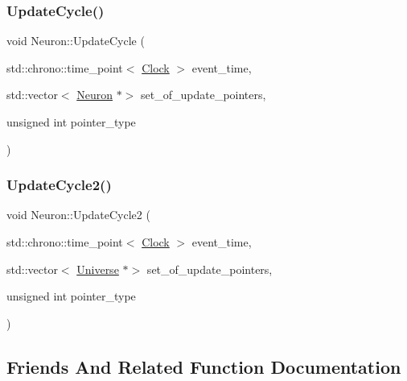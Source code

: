 \mbox{\label{classNeuron_a06f45a5d1de890da84d3644fe58ea0a9}} 
\subsubsection{\texorpdfstring{Update\+Cycle()}{UpdateCycle()}}
{\footnotesize\ttfamily void Neuron\+::\+Update\+Cycle (\begin{DoxyParamCaption}\item[{std\+::chrono\+::time\+\_\+point$<$ \mbox{\hyperlink{universe_8h_a0ef8d951d1ca5ab3cfaf7ab4c7a6fd80}{Clock}} $>$}]{event\+\_\+time,  }\item[{std\+::vector$<$ \mbox{\hyperlink{classNeuron}{Neuron}} $\ast$$>$}]{set\+\_\+of\+\_\+update\+\_\+pointers,  }\item[{unsigned int}]{pointer\+\_\+type }\end{DoxyParamCaption})}

\mbox{\label{classNeuron_a55c72e8066caf1ad8e25a2b0b453ee69}} 
\subsubsection{\texorpdfstring{Update\+Cycle2()}{UpdateCycle2()}}
{\footnotesize\ttfamily void Neuron\+::\+Update\+Cycle2 (\begin{DoxyParamCaption}\item[{std\+::chrono\+::time\+\_\+point$<$ \mbox{\hyperlink{universe_8h_a0ef8d951d1ca5ab3cfaf7ab4c7a6fd80}{Clock}} $>$}]{event\+\_\+time,  }\item[{std\+::vector$<$ \mbox{\hyperlink{classUniverse}{Universe}} $\ast$$>$}]{set\+\_\+of\+\_\+update\+\_\+pointers,  }\item[{unsigned int}]{pointer\+\_\+type }\end{DoxyParamCaption})}



\subsection{Friends And Related Function Documentation}
\mbox{\label{classNeuron_a2ae3e36fe53bb2c406559e5a7c309027}} 
